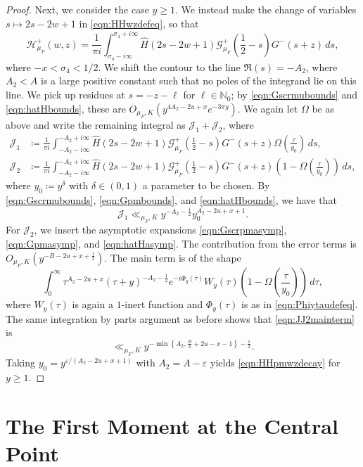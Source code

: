 \documentclass[11pt,a4paper]{amsart}
\newcommand{\e}{\varepsilon}
\newcommand{\Gscr}{\mathscr{G}}
\newcommand{\HH}{\mathcal{H}}
\newcommand{\JJ}{\mathcal{J}}
\newcommand{\N}{\mathbb{N}}
\numberwithin{equation}{section}
\theoremstyle{remark}
\theoremstyle{definition}
\begin{document}
\begin{proof}
Next, we consider the case $y \geq 1$. We instead make the change of variables $s \mapsto 2s - 2w + 1$ in \eqref{eqn:HHwzdefeq}, so that
\[\HH_{\mu_F}^{+}(w,z) = \frac{1}{\pi i} \int_{\sigma_4 - i\infty}^{\sigma_4 + i\infty} \widehat{H}(2s - 2w + 1) \Gscr_{\mu_F}^{+}\left(\frac{1}{2} - s\right) G^{-}(s + z) \, ds,\]
where $-x < \sigma_4 < 1/2$. We shift the contour to the line $\Re(s) = -A_2$, where $A_2 < A$ is a large positive constant such that no poles of the integrand lie on this line. We pick up residues at $s = -z - \ell$ for $\ell \in \N_0$; by \eqref{eqn:Gscrmubounds} and \eqref{eqn:hatHbounds}, these are $O_{\mu_F,K} (y^{4A_2 - 2u + x} e^{-3\pi y})$. We again let $\Omega$ be as above and write the remaining integral as $\JJ_1 + \JJ_2$, where
\begin{align*}
\JJ_1 & \coloneqq \frac{1}{\pi i} \int_{-A_2 - i\infty}^{-A_2 + i\infty} \widehat{H}(2s - 2w + 1) \Gscr_{\mu_F}^{+}\left(\frac{1}{2} - s\right) G^{-}(s + z) \Omega\left(\frac{\tau}{y_0}\right) \, ds,	\\
\JJ_2 & \coloneqq \frac{1}{\pi i} \int_{-A_2 - i\infty}^{-A_2 + i\infty} \widehat{H}(2s - 2w + 1) \Gscr_{\mu_F}^{+}\left(\frac{1}{2} - s\right) G^{-}(s + z) \left(1 - \Omega\left(\frac{\tau}{y_0}\right)\right) \, ds,
\end{align*}
where $y_0 \coloneqq y^{\delta}$ with $\delta \in (0,1)$ a parameter to be chosen. By \eqref{eqn:Gscrmubounds}, \eqref{eqn:Gpmbounds}, and \eqref{eqn:hatHbounds}, we have that
\[\JJ_1 \ll_{\mu_F,K} y^{-A_2 - \frac{1}{2}} y_0^{A_2 - 2u + x + 1}.\]
For $\JJ_2$, we insert the asymptotic expansions \eqref{eqn:Gscrpmasymp}, \eqref{eqn:Gpmasymp}, and \eqref{eqn:hatHasymp}. The contribution from the error terms is $O_{\mu_F,K}(y^{-B - 2u + x + \frac{1}{2}})$. The main term is of the shape
\begin{equation}
\label{eqn:JJ2mainterm}
\int_{0}^{\infty} \tau^{A_2 - 2u + x} (\tau + y)^{-A_2 - \frac{1}{2}} e^{-i\Phi_y(\tau)} W_y(\tau) \left(1 - \Omega\left(\frac{\tau}{y_0}\right)\right) \, d\tau,
\end{equation}
where $W_y(\tau)$ is again a $1$-inert function and $\Phi_y(\tau)$ is as in \eqref{eqn:Phiytaudefeq}. The same integration by parts argument as before shows that \eqref{eqn:JJ2mainterm} is
\[\ll_{\mu_F,K} y^{-\min\left\{A_2,\frac{B}{4} + 2u - x - 1\right\} - \frac{1}{2}}.\]
Taking $y_0 = y^{\e/(A_2 - 2u + x + 1)}$ with $A_2 = A - \e$ yields \eqref{eqn:HHpmwzdecay} for $y \geq 1$.
\end{proof}


\section{The First Moment at the Central Point}
\label{sect:firstmomentcentral}
\end{document}
